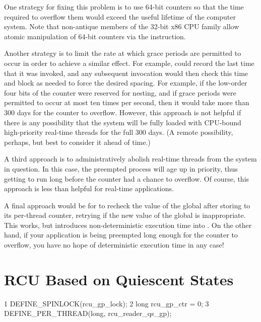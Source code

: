 {	One strategy for fixing this problem is to use 64-bit
	counters so that the time required to overflow them would exceed
	the useful lifetime of the computer system.
	Note that non-antique members of the 32-bit x86 CPU family
	allow atomic manipulation of 64-bit counters via the
	 instruction.

	Another strategy is to limit the rate at which grace periods are
	permitted to occur in order to achieve a similar effect.
	For example,  could record the last time
	that it was invoked, and any subsequent invocation would then
	check this time and block as needed to force the desired
	spacing.
	For example, if the low-order four bits of the counter were
	reserved for nesting, and if grace periods were permitted to
	occur at most ten times per second, then it would take more
	than 300 days for the counter to overflow.
	However, this approach is not helpful if there is any possibility
	that the system will be fully loaded with CPU-bound high-priority
	real-time threads for the full 300 days.
	(A remote possibility, perhaps, but best to consider it ahead
	of time.)

	A third approach is to administratively abolish real-time threads
	from the system in question.
	In this case, the preempted process will age up in priority,
	thus getting to run long before the counter had a chance to
	overflow.
	Of course, this approach is less than helpful for real-time
	applications.

	A final approach would be for  to recheck
	the value of the global  after storing to its
	per-thread  counter, retrying if the new
	value of the global  is inappropriate.
	This works, but introduces non-deterministic execution time
	into .
	On the other hand, if your application is being preempted long
	enough for the counter to overflow, you have no hope of
	deterministic execution time in any case!
} \QuickQuizEnd

\section{RCU Based on Quiescent States}
\label{sec:app:toyrcu:RCU Based on Quiescent States}

\begin{listing}[tbp]
{ \scriptsize
\begin{verbbox}
  1 DEFINE_SPINLOCK(rcu_gp_lock);
  2 long rcu_gp_ctr = 0;
  3 DEFINE_PER_THREAD(long, rcu_reader_qs_gp);
\end{verbbox}
}
\centering
\theverbbox
\caption{Data for Quiescent-State-Based RCU}
\label{lst:app:toyrcu:Data for Quiescent-State-Based RCU}
\end{listing}

